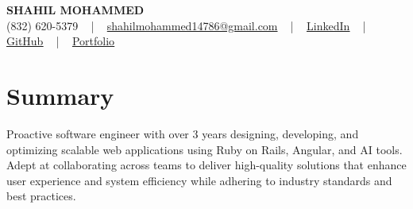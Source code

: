 \documentclass[letterpaper,10pt]{article}
\begin{document}
\begin{center}
    {\fontsize{14pt}{12pt}\selectfont \textbf{\MakeUppercase{Shahil Mohammed}}}\\ \vspace{2pt}
    \fontsize{10pt}{12pt}\selectfont (832) 620-5379 ~ | ~ \href{mailto:shahilmohammed14786@gmail.com}{shahilmohammed14786@gmail.com} ~ | ~  
    \href{https://www.linkedin.com/in/shahil-mohammed-9652931a1/}{\color{blue}\underline{LinkedIn}}  ~ | ~ 
    \href{https://github.com/freakbeast14}{\color{blue}\underline{GitHub}} ~ | ~ 
    \href{https://shahil-mohammed.netlify.app/}{\color{blue}\underline{Portfolio}}
    \vspace{-8pt}
\end{center}

\section{Summary}
\vspace{-2pt}\fontsize{8pt}{9pt}\selectfont
Proactive software engineer with over 3 years designing, developing, and optimizing scalable web applications using Ruby on Rails, Angular, and AI tools. Adept at collaborating across teams to deliver high-quality solutions that enhance user experience and system efficiency while adhering to industry standards and best practices.
 \vspace{-5pt}
 
\vspace{-2pt}
\end{document}
